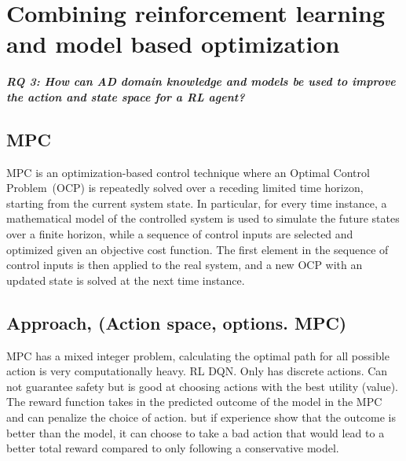 \newcommand {\matr}[2]{\left[\begin{array}{#1}#2\end{array}\right]}
\newcommand{\E}{\mathbb{E}}
\newcommand{\tr}{\mathrm{tr}}
\newcommand{\x}{{\mathbf{x}}}
\renewcommand{\u}{{\mathbf{u}}}
\newcommand{\w}{{\mathbf{w}}}
\renewcommand{\r}{{\mathbf{r}}}


\chapter{Combining reinforcement learning and model based optimization}\label{ch:mpc}
\begin{center}
\textit{\textbf{RQ 3: How can AD domain knowledge and models be used to improve the action and state space for a RL agent?}}
\end{center}
\vspace{12pt}


\section{MPC}
MPC is an optimization-based control technique where an Optimal Control Problem~(OCP) is repeatedly solved over a receding limited time horizon, starting from the current system state. In particular, for every time instance, a mathematical model of the controlled system is used to simulate the future states over a finite horizon, while a sequence of control inputs are selected and optimized given an objective cost function. The first element in the sequence of control inputs is then applied to the real system, and a new OCP with an updated state is solved at the next time instance.

\section{Approach, (Action space, options. MPC)}
MPC has a mixed integer problem, calculating the optimal path for all possible action is very computationally heavy. 
RL DQN. Only has discrete actions. Can not guarantee safety but is good at choosing actions with the best utility (value). 
The reward function takes in the predicted outcome of the model in the MPC and can penalize the choice of action. but if experience show that the outcome is better than the model, it can choose to take a bad action that would lead to a better total reward compared to only following a conservative model. 

